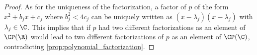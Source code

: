 \documentclass{article}
\begin{document}
\begin{proof}
  As for the uniqueness of the factorization, a factor of $p$ of the form $x^2 + b_jx + c_j$ where $b_j^2 < 4c_j$ can be uniquely written as $(x - \lambda_j)(x - \bar{\lambda}_j)$ with
  $\lambda_j \in \C$. This implies that if $p$ had two different factorizations as an element of $\CP(\R)$ would lead to two different factorizations of $p$ as an element of $\CP(\C)$,
  contradicting \eqref{prop:polynomial_factorization}.
\end{proof}
\end{document}

